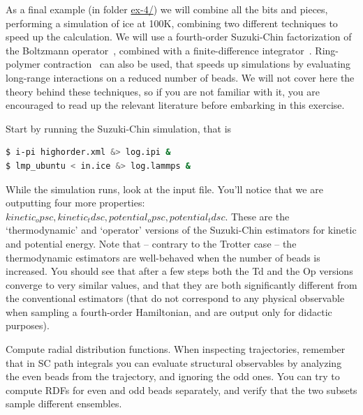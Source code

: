 \documentclass{article}
\begin{document}
\begin{Exercise}[label={sc-all},title={Doing PIMD Like a Pro}]
As a final example (in folder \url{ex-4/}) we will combine all the bits and pieces, performing
a simulation of ice at 100K, combining two different techniques to speed up
the calculation. We will use a fourth-order Suzuki-Chin factorization of
the Boltzmann operator~\cite{suzu95pla,chin97pla}, combined with a finite-difference
integrator~\cite{kapi+16}. Ring-polymer contraction~\cite{mark-mano08jcp} 
can also be used, that speeds up simulations by evaluating long-range interactions 
on a reduced number of beads.
We will not cover here the theory behind these techniques, 
so if you are not familiar with it, you are encouraged to read up the relevant 
literature before embarking in this exercise.

\Question Start by running the Suzuki-Chin simulation, that is
\begin{lstlisting}[language=bash]
$ i-pi highorder.xml &> log.ipi &
$ lmp_ubuntu < in.ice &> log.lammps &
\end{lstlisting}
While the simulation runs, look at the input file. You'll notice
that we are outputting four more properties: 
\lstinxml$kinetic_opsc, kinetic_tdsc, potential_opsc, potential_tdsc$. These
are the `thermodynamic' and `operator' versions of the Suzuki-Chin estimators
for kinetic and potential energy. Note that -- contrary to the Trotter case --
the thermodynamic estimators are well-behaved when the number of beads is 
increased. You should see that after a few steps both the Td and the Op 
versions converge to very similar values, and that they are both significantly
different from the conventional estimators (that do not correspond to any
physical observable when sampling a fourth-order Hamiltonian, and are output
only for didactic purposes). 

\Question Compute radial distribution functions. 
When inspecting trajectories,  remember that in SC path integrals you can 
evaluate structural observables by analyzing the even beads from the trajectory,
and ignoring the odd ones. You can try to compute RDFs for even and odd beads
separately, and verify that the two subsets sample different ensembles. 


\end{Exercise}
\end{document}
